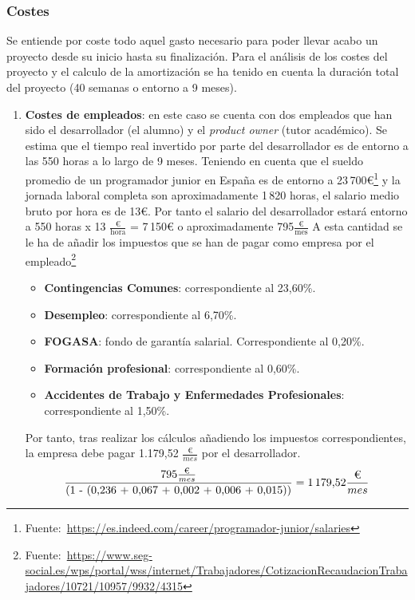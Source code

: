 \subsubsection{Costes}
Se entiende por coste todo aquel gasto necesario para poder llevar acabo un proyecto desde su inicio hasta su finalización. Para el análisis de los costes del proyecto y el calculo de la amortización se ha tenido en cuenta la duración total del proyecto (40 semanas o entorno a 9 meses).
\begin{enumerate}
\item \textbf{Costes de empleados}: en este caso se cuenta con dos empleados que han sido el desarrollador (el alumno) y el \textit{product owner} (tutor académico).
Se estima que el tiempo real invertido por parte del desarrollador es de entorno a las 550 horas a lo largo de 9 meses. Teniendo en cuenta que el sueldo promedio de un programador junior en España es de entorno a 23\,700€\footnote{Fuente:~\url{https://es.indeed.com/career/programador-junior/salaries}} y la jornada laboral completa son aproximadamente 1\,820 horas, el salario medio bruto por hora es de 13€. Por tanto el salario del desarrollador estará entorno a 550 horas x 13 \(\frac{\text{€}}{\text{hora}}\) = 7\,150€ o aproximadamente 795\(\frac{\text{€}}{\text{mes}}\)
A esta cantidad se le ha de añadir los impuestos que se han de pagar como empresa por el empleado\footnote{Fuente:~\url{https://www.seg-social.es/wps/portal/wss/internet/Trabajadores/CotizacionRecaudacionTrabajadores/10721/10957/9932/4315}}
\begin{itemize}
\item \textbf{Contingencias Comunes}: correspondiente al 23,60\%.
\item \textbf{Desempleo}: correspondiente al 6,70\%.
\item \textbf{FOGASA}: fondo de garantía salarial. Correspondiente al 0,20\%.
\item \textbf{Formación profesional}: correspondiente al 0,60\%.
\item \textbf{Accidentes de Trabajo y Enfermedades Profesionales}: correspondiente al 1,50\%.
\end{itemize}
Por tanto, tras realizar los cálculos añadiendo los impuestos correspondientes, la empresa debe pagar 1.179,52 \(\frac{\text{€}}{mes}\) por el desarrollador.
\begin{equation}
\frac{795\frac{\text{€}}{mes}}{\text{(1 - (0,236 + 0,067 + 0,002 + 0,006 + 0,015))}} = \text{1\,179,52} \frac{\text{€}}{mes}
\end{equation}


\end{enumerate}
